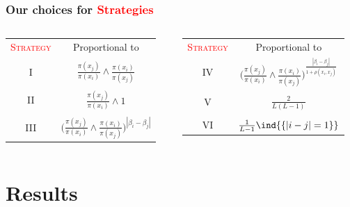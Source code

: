 \documentclass[xetex]{beamer}
\begin{document}
	\begin{frame}[t]\frametitle{Our choices for \textcolor{red}{Strategies}}
	    
	   	\begin{columns} 
	    	\begin{column}[t]{.5\textwidth}	
				\begin{table}[htbp]
					\begin{tabular}{cc}
					\textcolor{red}{\textsc{Strategy}} & Proportional to \\ 
					&\\
					I &  $\frac{\pi (x_j)}{\pi( x_i )} \wedge \frac{\pi (x_i)}{\pi( x_j )}$ \\ 
					&\\
					II & $\frac{\pi (x_j)}{\pi( x_i )} \wedge 1$ \\ 
					&\\
					III & $\Big( \frac{\pi (x_j)}{\pi( x_i )} \wedge 
								\frac{\pi (	x_i)}{\pi( x_j )} \Big)^{|\beta_i - \beta_j|}$
					\end{tabular}
				\end{table}
			\end{column}
			\begin{column}[t]{.5\textwidth}			
				\begin{table}[htbp]
					\begin{tabular}{cc}
					\textcolor{red}{\textsc{Strategy}} & Proportional to \\ 
					IV & $\Big( \frac{\pi (x_j)}{\pi( x_i )} \wedge \frac{\pi (x_i)}{\pi( x_j )} \Big)^\frac{|\beta_i - \beta_j|}{1 + \rho(x_i, x_j)}$ \\ 
					&\\
					V & $\frac{2}{L (L - 1)}$ \\ 
					&\\
					VI & $\frac{1}{L - 1} \ind{\{|i-j|=1\}}$ \\ 
					\end{tabular}
				\end{table}
			\end{column}
		\end{columns}	
	\end{frame}


\section{Results}
	
\end{document}
